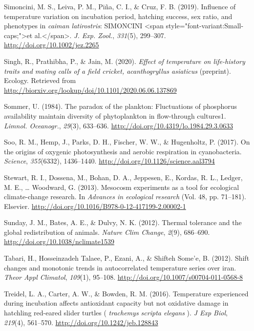 \documentclass[12pt,twoside]{reedthesis}
\begin{document}
\leavevmode\hypertarget{ref-simoncini_influence_2019}{}%
Simoncini, M. S., Leiva, P. M., Piña, C. I., \& Cruz, F. B. (2019). Influence of temperature variation on incubation period, hatching success, sex ratio, and phenotypes in \emph{caiman latirostris}: SIMONCINI \textless{}span style="font-variant:Small-caps;"\textgreater{}et al.\textless{}/span\textgreater{}. \emph{J. Exp. Zool.}, \emph{331}(5), 299--307. \url{http://doi.org/10.1002/jez.2265}

\leavevmode\hypertarget{ref-singh_effect_2020}{}%
Singh, R., Prathibha, P., \& Jain, M. (2020). \emph{Effect of temperature on life-history traits and mating calls of a field cricket, \textup{acanthogryllus asiaticus}} (preprint). Ecology. Retrieved from \url{http://biorxiv.org/lookup/doi/10.1101/2020.06.06.137869}

\leavevmode\hypertarget{ref-sommer_paradox_1984}{}%
Sommer, U. (1984). The paradox of the plankton: Fluctuations of phosphorus availability maintain diversity of phytoplankton in flow-through cultures1. \emph{Limnol. Oceanogr.}, \emph{29}(3), 633--636. \url{http://doi.org/10.4319/lo.1984.29.3.0633}

\leavevmode\hypertarget{ref-soo_origins_2017}{}%
Soo, R. M., Hemp, J., Parks, D. H., Fischer, W. W., \& Hugenholtz, P. (2017). On the origins of oxygenic photosynthesis and aerobic respiration in cyanobacteria. \emph{Science}, \emph{355}(6332), 1436--1440. \url{http://doi.org/10.1126/science.aal3794}

\leavevmode\hypertarget{ref-stewart_mesocosm_2013}{}%
Stewart, R. I., Dossena, M., Bohan, D. A., Jeppesen, E., Kordas, R. L., Ledger, M. E., \ldots{} Woodward, G. (2013). Mesocosm experiments as a tool for ecological climate-change research. In \emph{Advances in ecological research} (Vol. 48, pp. 71--181). Elsevier. \url{http://doi.org/10.1016/B978-0-12-417199-2.00002-1}

\leavevmode\hypertarget{ref-sunday_thermal_2012}{}%
Sunday, J. M., Bates, A. E., \& Dulvy, N. K. (2012). Thermal tolerance and the global redistribution of animals. \emph{Nature Clim Change}, \emph{2}(9), 686--690. \url{http://doi.org/10.1038/nclimate1539}

\leavevmode\hypertarget{ref-tabari_shift_2012}{}%
Tabari, H., Hosseinzadeh Talaee, P., Ezani, A., \& Shifteh Some'e, B. (2012). Shift changes and monotonic trends in autocorrelated temperature series over iran. \emph{Theor Appl Climatol}, \emph{109}(1), 95--108. \url{http://doi.org/10.1007/s00704-011-0568-8}

\leavevmode\hypertarget{ref-treidel_temperature_2016-1}{}%
Treidel, L. A., Carter, A. W., \& Bowden, R. M. (2016). Temperature experienced during incubation affects antioxidant capacity but not oxidative damage in hatchling red-eared slider turtles ( \emph{trachemys scripta elegans} ). \emph{J Exp Biol}, \emph{219}(4), 561--570. \url{http://doi.org/10.1242/jeb.128843}
\end{document}
